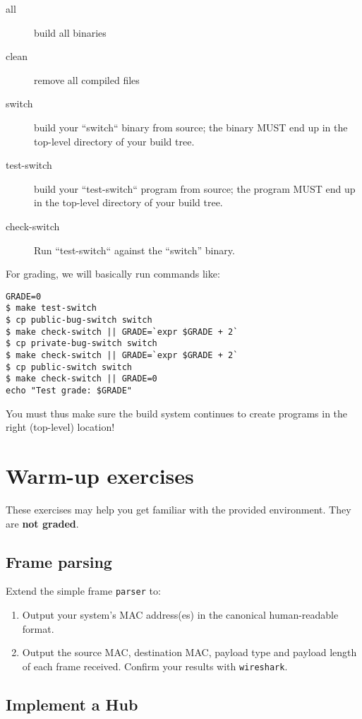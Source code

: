 \documentclass{article}
\begin{document}
\begin{description}
\item[all] build all binaries
\item[clean] remove all compiled files
\item[switch] build your ``switch`` binary from source; the binary MUST end up in the top-level directory of your build tree.
\item[test-switch] build your ``test-switch`` program from source; the program MUST end up in the top-level directory of your build tree.
\item[check-switch] Run ``test-switch`` against the ``switch'' binary.
\end{description}

For grading, we will basically run commands like:
\begin{verbatim}
GRADE=0
$ make test-switch
$ cp public-bug-switch switch
$ make check-switch || GRADE=`expr $GRADE + 2`
$ cp private-bug-switch switch
$ make check-switch || GRADE=`expr $GRADE + 2`
$ cp public-switch switch
$ make check-switch || GRADE=0
echo "Test grade: $GRADE"
\end{verbatim}
You must thus make sure the build system continues to create programs in the
right (top-level) location!


\section{Warm-up exercises}

These exercises may help you get familiar with the provided environment.
They are {\bf not graded}.

\subsection{Frame parsing}

Extend the simple frame {\tt parser} to:
\begin{enumerate}
\item Output your system's MAC address(es) in the canonical human-readable format.
\item Output the source MAC, destination MAC, payload type and payload length
  of each frame received. Confirm your results with {\tt wireshark}.
\end{enumerate}

\subsection{Implement a Hub}
\end{document}
